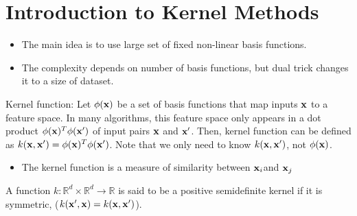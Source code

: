 \chapter{Introduction to Kernel Methods}
\begin{itemize}
	\item The main idea is to use large set of fixed non-linear basis functions.
	\item The complexity depends on number of basis functions, but dual trick changes it to a size of dataset. 
\end{itemize}

Kernel function: Let $\phi({\mathbf{x}})$ be a set of basis functions that map inputs ${\mathbf{x}}$ to a feature space. In many algorithms, this feature space only appears in a dot product $\phi({\mathbf{x}})^T\phi({\mathbf{x}}')$ of input pairs ${\mathbf{x}}$ and ${\mathbf{x}}'$. Then, kernel function can be defined as $k({\mathbf{x}}, {\mathbf{x}}') = \phi({\mathbf{x}})^T\phi({\mathbf{x}}')$. Note that we only need to know $k({\mathbf{x}}, {\mathbf{x}}')$, not $\phi({\mathbf{x}})$.
\begin{itemize}
	\item The kernel function is a measure of similarity between ${\mathbf{x}}_i$and ${\mathbf{x}}_j$ 
\end{itemize}

A function $k: \mathbb{R}^d\times \mathbb{R}^d\to \mathbb{R}$ is said to be a positive semidefinite kernel if it is symmetric, (\ie $k({\mathbf{x}}',{\mathbf{x}})= k({\mathbf{x}},{\mathbf{x}}')$).

